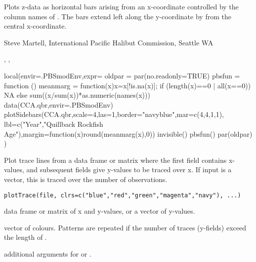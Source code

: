 \documentclass[letterpaper]{book}
\begin{document}
%
\begin{Details}\relax
Plots z-data as horizontal bars arising from an x-coordinate controlled by
the column names of . The bars extend left along the y-coordinate 
by  from the central x-coordinate. 
\end{Details}
%
\begin{Author}\relax
Steve Martell, International Pacific Halibut Commission, Seattle WA
\end{Author}
%
\begin{SeeAlso}\relax
{}, ,
\end{SeeAlso}
%
\begin{Examples}
\begin{ExampleCode}
local(envir=.PBSmodEnv,expr={
  oldpar = par(no.readonly=TRUE)
  pbsfun = function () {
    meanmarg = function(x){x=x[!is.na(x)]; 
      if (length(x)==0 | all(x==0)) NA else sum((x/sum(x))*as.numeric(names(x)))}
    data(CCA.qbr,envir=.PBSmodEnv)
    plotSidebars(CCA.qbr,scale=4,las=1,border="navyblue",mar=c(4,4,1,1),
      lbl=c("Year","Quillback Rockfish Age"),margin=function(x){round(meanmarg(x),0)})
    invisible() }
  pbsfun()
  par(oldpar)
})
\end{ExampleCode}
\end{Examples}
%
\begin{Description}\relax
Plot trace lines from a data frame or matrix where the first field contains x-values, 
and subsequent fields give y-values to be traced over x. If input is a vector, 
this is traced over the number of observations.
\end{Description}
%
\begin{Usage}
\begin{verbatim}
plotTrace(file, clrs=c("blue","red","green","magenta","navy"), ...)
\end{verbatim}
\end{Usage}
%
\begin{Arguments}
\begin{ldescription}
\item[\code{file}] data frame or matrix of x and y-values, or a vector of y-values.
\item[\code{clrs}] vector of colours. Patterns are repeated if the number 
of traces (y-fields) exceed the length of .
\item[\code{...}] additional arguments for  or .
\end{ldescription}
\end{Arguments}
\end{document}
